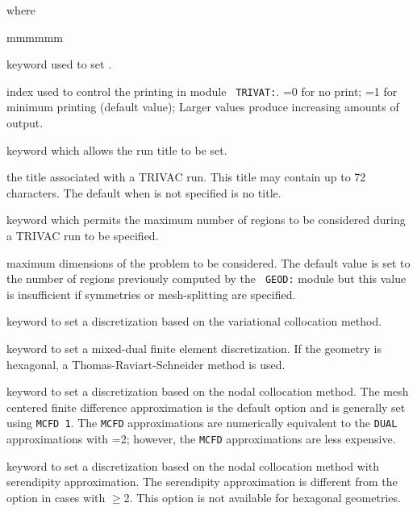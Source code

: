 \noindent where
\begin{ListeDeDescription}{mmmmmm}

\item[\moc{EDIT}] keyword used to set .

\item[\dusa{iprint}] index used to control the printing  in module {\tt
TRIVAT:}. =0 for no print; =1 for minimum printing (default value); Larger
values produce increasing amounts of output.

\item[\moc{TITL}] keyword which allows the run title to be set.

\item[\dusa{TITLE}] the title associated with a TRIVAC run. This
title may contain up to 72 characters. The default when  is not specified is no title.

\item[\moc{MAXR}] keyword which permits the maximum number of regions to be considered during a TRIVAC run to be specified.

\item[\dusa{maxpts}] maximum dimensions of the problem to be considered.  The
default value is set to the number of regions previously computed by the {\tt
GEOD:} module but this value is insufficient if symmetries or mesh-splitting
are specified.

\item[\moc{PRIM}] keyword to set a discretization based on the variational collocation method.

\item[\moc{DUAL}] keyword to set a mixed-dual finite element discretization. If the
geometry is hexagonal, a Thomas-Raviart-Schneider method is used.\cite{rts}

\item[\moc{MCFD}] keyword to set a discretization based  on the nodal
collocation method. The mesh centered finite difference approximation is the
default option and is generally set using {\tt MCFD~1}. The {\tt MCFD}
approximations are numerically equivalent to the {\tt DUAL} approximations
with =2; however, the {\tt MCFD} approximations are less
expensive. 

\item[\moc{LUMP}] keyword to set a discretization  based on the nodal
collocation method with serendipity approximation. The serendipity
approximation is different from the  option in cases with $\ge$2. This option is not available for hexagonal geometries.


\end{ListeDeDescription}
